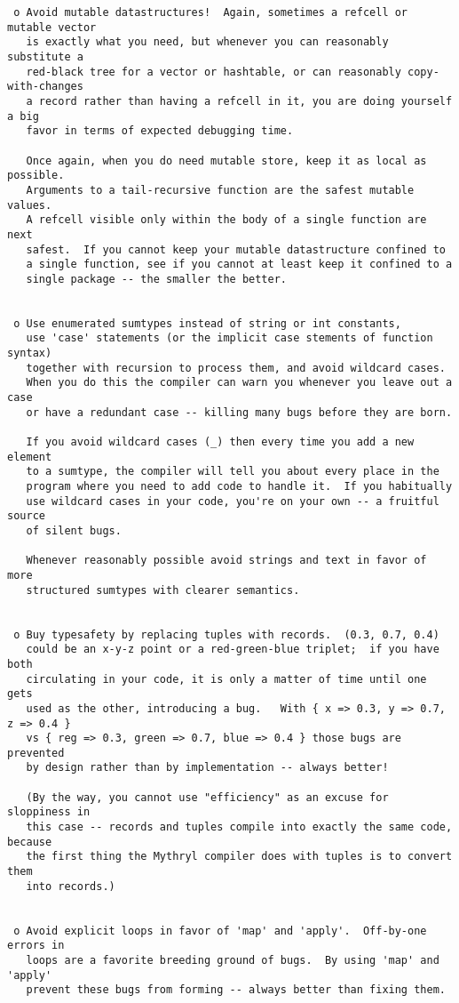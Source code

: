 \begin{verbatim}
 o Avoid mutable datastructures!  Again, sometimes a refcell or mutable vector
   is exactly what you need, but whenever you can reasonably substitute a
   red-black tree for a vector or hashtable, or can reasonably copy-with-changes
   a record rather than having a refcell in it, you are doing yourself a big
   favor in terms of expected debugging time.

   Once again, when you do need mutable store, keep it as local as possible.
   Arguments to a tail-recursive function are the safest mutable values.
   A refcell visible only within the body of a single function are next
   safest.  If you cannot keep your mutable datastructure confined to
   a single function, see if you cannot at least keep it confined to a
   single package -- the smaller the better.


 o Use enumerated sumtypes instead of string or int constants,
   use 'case' statements (or the implicit case stements of function syntax)
   together with recursion to process them, and avoid wildcard cases.
   When you do this the compiler can warn you whenever you leave out a case
   or have a redundant case -- killing many bugs before they are born.

   If you avoid wildcard cases (_) then every time you add a new element
   to a sumtype, the compiler will tell you about every place in the
   program where you need to add code to handle it.  If you habitually
   use wildcard cases in your code, you're on your own -- a fruitful source
   of silent bugs.

   Whenever reasonably possible avoid strings and text in favor of more
   structured sumtypes with clearer semantics.


 o Buy typesafety by replacing tuples with records.  (0.3, 0.7, 0.4)
   could be an x-y-z point or a red-green-blue triplet;  if you have both
   circulating in your code, it is only a matter of time until one gets
   used as the other, introducing a bug.   With { x => 0.3, y => 0.7, z => 0.4 }
   vs { reg => 0.3, green => 0.7, blue => 0.4 } those bugs are prevented
   by design rather than by implementation -- always better!

   (By the way, you cannot use "efficiency" as an excuse for sloppiness in
   this case -- records and tuples compile into exactly the same code, because
   the first thing the Mythryl compiler does with tuples is to convert them
   into records.)


 o Avoid explicit loops in favor of 'map' and 'apply'.  Off-by-one errors in
   loops are a favorite breeding ground of bugs.  By using 'map' and 'apply'
   prevent these bugs from forming -- always better than fixing them.



\end{verbatim}
